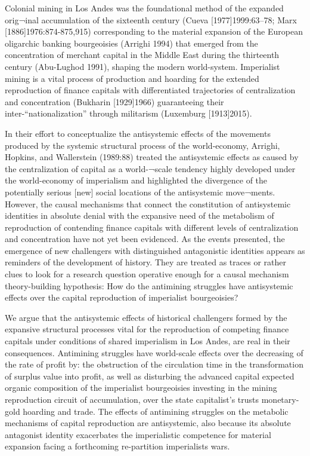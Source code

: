 \documentclass[
]{article}
\begin{document}
Colonial mining in Los Andes was the foundational method of the expanded
orig¬inal accumulation of the sixteenth century (Cueva
{[}1977{]}1999:63--78; Marx {[}1886{]}1976:874-875,915) corresponding to
the material expansion of the European oligarchic banking bourgeoisies
(Arrighi 1994) that emerged from the concentration of merchant capital
in the Middle East during the thirteenth century (Abu-Lughod 1991),
shaping the modern world-system. Imperialist mining is a vital process
of production and hoarding for the extended reproduction of finance
capitals with differentiated trajectories of centralization and
concentration (Bukharin {[}1929{]}1966) guaranteeing their
inter-``nationalization'' through militarism (Luxemburg {[}1913{]}2015).

In their effort to conceptualize the antisystemic effects of the
movements produced by the systemic structural process of the
world-economy, Arrighi, Hopkins, and Wallerstein (1989:88) treated the
antisystemic effects as caused by the centralization of capital as a
world-¬scale tendency highly developed under the world-economy of
imperialism and highlighted the divergence of the potentially serious
{[}new{]} social locations of the antisystemic move¬ments. However, the
causal mechanisms that connect the constitution of antisystemic
identities in absolute denial with the expansive need of the metabolism
of reproduction of contending finance capitals with different levels of
centralization and concentration have not yet been evidenced. As the
events presented, the emergence of new challengers with distinguished
antagonistic identities appears as reminders of the development of
history. They are treated as traces or rather clues to look for a
research question operative enough for a causal mechanism
theory-building hypothesis: How do the antimining struggles have
antisystemic effects over the capital reproduction of imperialist
bourgeoisies?

We argue that the antisystemic effects of historical challengers formed
by the expansive structural processes vital for the reproduction of
competing finance capitals under conditions of shared imperialism in Los
Andes, are real in their consequences. Antimining struggles have
world-scale effects over the decreasing of the rate of profit by: the
obstruction of the circulation time in the transformation of surplus
value into profit, as well as disturbing the advanced capital expected
organic composition of the imperialist bourgeoisies investing in the
mining reproduction circuit of accumulation, over the state capitalist's
trusts monetary-gold hoarding and trade. The effects of antimining
struggles on the metabolic mechanisms of capital reproduction are
antisystemic, also because its absolute antagonist identity exacerbates
the imperialistic competence for material expansion facing a forthcoming
re-partition imperialists wars.
\end{document}
